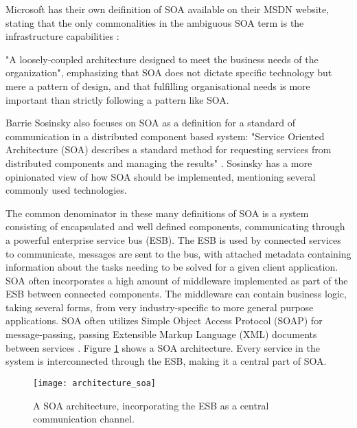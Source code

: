 Microsoft has their own deifinition of SOA available on their MSDN website, stating that the only commonalities in the ambiguous SOA term is the infrastructure capabilities \cite{microsoft2017chapter}: {"A loosely‐coupled architecture designed to meet the business needs of the organization", emphasizing that SOA does not dictate specific technology but mere a pattern of design, and that fulfilling organisational needs is more important than strictly following a pattern like SOA.

Barrie Sosinsky also focuses on SOA as a definition for a standard of communication in a distributed component based system: "Service Oriented Architecture (SOA) describes a standard method for requesting services from distributed components and managing the results" \cite{sosinsky2010cloud}. Sosinsky has a more opinionated view of how SOA should be implemented, mentioning several commonly used technologies.

The common denominator in these many definitions of SOA is a system consisting of encapsulated and well defined components, communicating through a powerful enterprise service bus (ESB). The ESB is used by connected services to communicate, messages are sent to the bus, with attached metadata containing information about the tasks needing to be solved for a given client application. SOA often incorporates a high amount of middleware implemented as part of the ESB between connected components. The middleware can contain business logic, taking several forms, from very industry-specific to more general purpose applications. SOA often utilizes Simple Object Access Protocol (SOAP) for message-passing, passing Extensible Markup Language (XML) documents between services \cite[p.~272]{sosinsky2010cloud}. Figure \ref{fig:architecture_soa} shows a SOA architecture. Every service in the system is interconnected through the ESB, making it a central part of SOA.

\begin{figure}[!htb]
\begin{center} 
  \texttt{[image: architecture\_soa]}  
  \caption{A SOA architecture, incorporating the ESB as a central communication channel.}
  \label{fig:architecture_soa}
  \end{center}
\end{figure}

}
